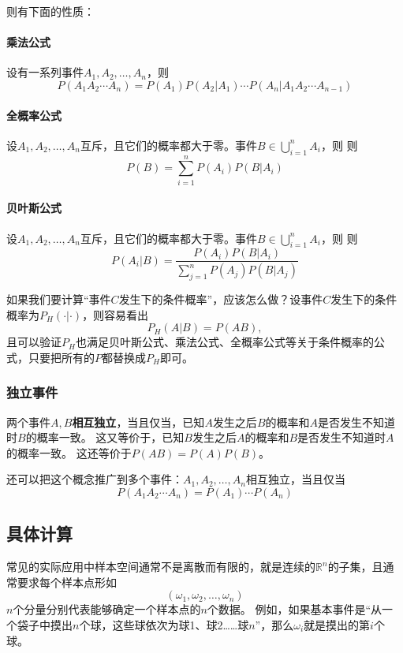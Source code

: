 \documentclass[UTF8, a4paper]{ctexart}
\newcommand*{\reals}{\mathbb{R}}
\begin{document}
则有下面的性质：
\paragraph{乘法公式} 设有一系列事件$A_1, A_2, \ldots, A_n$，则
\[
    P(A_1 A_2 \cdots A_n) = P(A_1) P(A_2|A_1) \cdots P(A_n | A_1 A_2 \cdots A_{n-1})
\]

\paragraph{全概率公式} 设$A_1, A_2, \ldots, A_n$互斥，且它们的概率都大于零。事件$B \in \bigcup_{i=1}^n A_i$，则
则
\[
    P(B) = \sum_{i=1}^n P(A_i) P(B | A_i)
\]

\paragraph{贝叶斯公式} 设$A_1, A_2, \ldots, A_n$互斥，且它们的概率都大于零。事件$B \in \bigcup_{i=1}^n A_i$，则
则
\[
    P(A_i | B) = \frac{P(A_i) P(B|A_i)}{\sum_{j=1}^n P(A_j) P(B|A_j)}
\]

如果我们要计算“事件$C$发生下的条件概率”，应该怎么做？设事件$C$发生下的条件概率为$P_H(\cdot | \cdot)$，则容易看出
\begin{equation}
    P_H(A | B) = P(A B),
\end{equation}
且可以验证$P_H$也满足贝叶斯公式、乘法公式、全概率公式等关于条件概率的公式，只要把所有的$P$都替换成$P_H$即可。

\subsubsection{独立事件}

两个事件$A, B$\textbf{相互独立}，当且仅当，已知$A$发生之后$B$的概率和$A$是否发生不知道时$B$的概率一致。
这又等价于，已知$B$发生之后$A$的概率和$B$是否发生不知道时$A$的概率一致。
这还等价于$P(AB)=P(A)P(B)$。

还可以把这个概念推广到多个事件：$A_1, A_2, \ldots, A_n$\textbf{}{相互独立}，当且仅当
\[
    P(A_1 A_2 \cdots A_n) = P(A_1) \cdots P(A_n)
\]

\subsection{具体计算}

常见的实际应用中样本空间通常不是离散而有限的，就是连续的$\reals^n$的子集，且通常要求每个样本点形如
\[
    (\omega_1, \omega_2, \ldots, \omega_n)
\]
$n$个分量分别代表能够确定一个样本点的$n$个数据。
例如，如果基本事件是“从一个袋子中摸出$n$个球，这些球依次为球1、球2……球$n$”，那么$\omega_i$就是摸出的第$i$个球。
\end{document}
